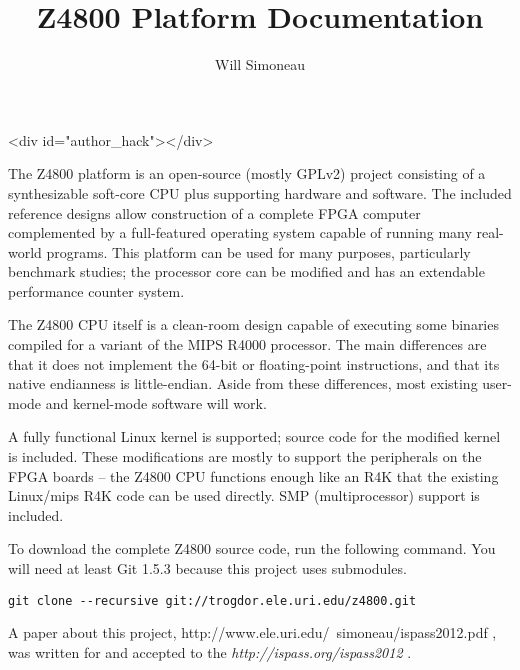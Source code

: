 \documentclass{article}
\title{Z4800 Platform Documentation}
\author{Will Simoneau}
\newcommand{\tm}{\latexhtml{\texttrademark}{\begin{rawhtml}&\#8482;\end{rawhtml}}}
\newcommand{\rtm}{\latexhtml{\textregistered}{\begin{rawhtml}&reg;\end{rawhtml}}}
\begin{document}
\maketitle

\begin{rawhtml}
<div id="author_hack"></div>
\end{rawhtml}

The Z4800 platform is an open-source (mostly GPLv2) project consisting of a
synthesizable soft-core CPU plus supporting hardware and software. The included
reference designs allow construction of a complete FPGA computer complemented
by a full-featured operating system capable of running many real-world
programs. This platform can be used for many purposes, particularly benchmark
studies; the processor core can be modified and has an extendable performance
counter system.

The Z4800 CPU itself is a clean-room design capable of executing some binaries
compiled for a variant of the MIPS\rtm{} R4000\tm{} processor. The main
differences are that it does not implement the 64-bit or floating-point
instructions, and that its native endianness is little-endian.  Aside from
these differences, most existing user-mode and kernel-mode software will work.

A fully functional Linux kernel is supported; source code for the modified
kernel is included. These modifications are mostly to support the peripherals
on the FPGA boards -- the Z4800 CPU functions enough like an R4K that the
existing Linux/mips R4K code can be used directly. SMP (multiprocessor) support
is included.

To download the complete Z4800 source code, run the following command. You will
need at least Git 1.5.3 because this project uses submodules.
\begin{verbatim}
git clone --recursive git://trogdor.ele.uri.edu/z4800.git
\end{verbatim}

A paper about this project,
%
   {http://www.ele.uri.edu/~simoneau/ispass2012.pdf}%
, was written for and accepted to the
\emph{%
   {http://ispass.org/ispass2012}%
}.

\smallskip
\end{document}
